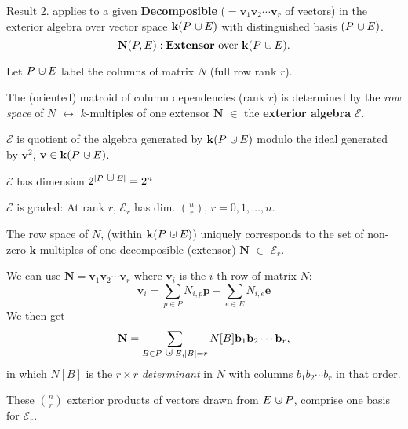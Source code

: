 \documentclass[%
  slidesonly,%
  semlayer,%
  amsmath
  ]{seminar}                                  %
\newcommand{\dunion}
{\mbox{\hbox{\hskip6pt$\cdot$\hskip-5.50pt$\cup$\hskip2pt}}}
\begin{document}
\begin{slide}
Result 2. applies to a given
\textbf{Decomposible}  
($=\mathbf{v}_1\mathbf{v}_2\cdots\mathbf{v}_r$ of
vectors)
in the exterior algebra over vector space
$\mathbf{k}(P\dunion E)$ with distinguished basis $(P\dunion E)$.
\[
\mathbf{N}(P,E): \text{\textbf{Extensor} over }\mathbf{k}(P\dunion E).
\]

Let $P\dunion E$ label the columns of matrix $N$ (full row rank $r$).


The (oriented) matroid of column dependencies (rank $r$) is determined by 
the \textit{row space} of $N$ $\leftrightarrow$ $k$-multiples of one extensor
$\mathbf{N}$
$\in$ the \textbf{exterior algebra} $\mathcal{E}$.

$\mathcal{E}$ is quotient of the algebra 
generated by $\mathbf{k}(P\dunion E)$
modulo the ideal generated by $\mathbf{v}^2$, $\mathbf{v}\in \mathbf{k}(P\dunion E)$.

$\mathcal{E}$ has dimension $2^{|P\dunion E|}=2^n$. 

$\mathcal{E}$ is graded: At rank $r$, $\mathcal{E}_r$ has 
dim. $\binom{n}{r}$, $r=0,1,\ldots,n$.

\end{slide}

\begin{slide}
The row space of $N$, (within $\mathbf{k}(P\dunion E)$) 
uniquely corresponds to the set of non-zero $\mathbf{k}$-multiples of one 
decomposible (extensor) $\mathbf{N}$ $\in$ $\mathcal{E}_r$.

We can use $\mathbf{N}=\mathbf{v}_1\mathbf{v}_2\cdots\mathbf{v}_r$ where
$\mathbf{v}_i$ is the $i$-th row of matrix $N$:
\[
\mathbf{v}_i = \sum_{p\in P}N_{i,p}\mathbf{p} + \sum_{e\in E}N_{i,e}\mathbf{e}
\]
We then get
\[
\mathbf{N} = \sum_{B\in P\dunion E, |B|=r}N[B]\mathbf{b}_1\mathbf{b}_2\cdots\mathbf{b}_r,
\]
in which $N[B]$ is the $r\times r$ \textit{determinant} in $N$ with columns 
$b_1b_2\cdots b_r$ in that order.

These $\binom{n}{r}$ exterior products of vectors drawn from
$E\dunion P$, comprise one basis for $\mathcal{E}_r$.

\end{slide}
\end{document}
